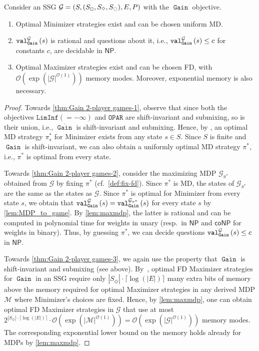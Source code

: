\documentclass[a4paper,UKenglish,cleveref,autoref,thm-restate]{lipics-v2021}
\DeclareMathOperator{\Gain}{\mathtt{Gain}}
\newcommand{\Oparity}{\mathtt{OPAR}}
\newcommand{\LimInf}[2]{\mathtt{LimInf}(#1 #2)}
\newcommand{\+}[1]{\mathbb{#1}}
\newcommand{\?}[1]{\mathcal{#1}}
\newcommand{\Ocompl}{\?{O}}
\newcommand{\rsymbol}{\ocircle}
\newcommand{\zsymbol}{\Box}
\newcommand{\osymbol}{\Diamond}
\newcommand{\zstates}{\states_\zsymbol}
\newcommand{\rstates}{\states_\rsymbol}
\newcommand{\ostates}{\states_\osymbol}
\newcommand{\NP}{\ensuremath{\mathsf{NP}}}
\newcommand{\coNP}{\ensuremath{\mathsf{coNP}}}
\newcommand{\lrc}[1]{\left(#1\right)}
\newcommand{\tuple}[1]{\lrc{#1}}
\newcommand{\game}{{\mathcal G}}
\newcommand{\mdp}{{\mathcal M}}
\newcommand{\gametuple}{\tuple{\states,(\zstates,\ostates,\rstates),\transition,\probp}}
\newcommand{\states}{S}
\newcommand{\s}{s}
\newcommand{\transition}{{E}}
\newcommand{\probp}{P}
\newcommand{\complementof}[1]{\overline{#1}}
\newcommand{\ostrat}{\pi}
\newcommand{\optostrat}{\ostrat^*}
\begin{document}
\begin{theorem}\label{thm:Gain 2-player games}
Consider an SSG $\game = \gametuple$ with the $\Gain$ objective.
\begin{enumerate}
\item\label{thm:Gain 2-player games-1}
  Optimal Minimizer strategies exist and can be chosen uniform MD.
\item\label{thm:Gain 2-player games-2}
  $\valueof[\game][\Gain]{\s}$ is rational and 
  questions about it, i.e., $\valueof[\game][\Gain]{\s} \le c$ for
  constants $c$, are decidable in $\NP$.
\item\label{thm:Gain 2-player games-3}
    Optimal Maximizer strategies exist and can be chosen FD,
    with $\Ocompl(\exp(|\game|^{\Ocompl(1)}))$ memory modes.
    Moreover, exponential memory is also necessary.  
\end{enumerate}
\end{theorem}
\begin{proof}
Towards \cref{thm:Gain 2-player games-1}, observe that since both the objectives $\LimInf{=}{-\infty}$ and
$\Oparity$ are shift-invariant and submixing, so is their union, i.e.,
$\complementof{\Gain}$ is shift-invariant and submixing.
Hence, by \cite[Theorem 1.1]{GK2022},
an optimal MD strategy $\optostrat_\s$ for Minimizer
exists from any state $\s \in \states$.
Since $\states$ is finite and $\Gain$ is shift-invariant,
we can also obtain a uniformly optimal MD strategy
$\optostrat$, i.e., $\optostrat$ is optimal from every state.

Towards \cref{thm:Gain 2-player games-2},
consider the maximizing MDP $\game_{\optostrat}$ obtained from $\game$ by 
fixing $\optostrat$ (cf.~\cref{def:fix-fd}).
Since $\optostrat$ is MD, the states of $\game_{\optostrat}$ are the
same as the states as $\game$.
Since $\optostrat$ is optimal for Minimizer from every state $\s$,
we obtain that $\valueof[\game][\Gain]{\s} =
\valueof[\game_{\optostrat}][\Gain]{\s}$ for every state $\s$ by
\cref{lem:MDP_to_game}.
By \cref{lem:maxmdp}, the latter is rational and can be computed in polynomial time for
weights in unary (resp.\ in $\NP$ and $\coNP$ for weights in binary).
Thus, by guessing $\optostrat$, we can decide questions
$\valueof[\game][\Gain]{\s} \le c$ in $\NP$.

Towards \cref{thm:Gain 2-player games-3}, we again use the property
that $\complementof{\Gain}$ is shift-invariant and submixing (see above).
By~\cite[Theorem 6, Def.~24]{MSTW2021}, optimal FD Maximizer strategies for $\Gain$ in an SSG require
only $|\ostates| \cdot \lceil\log(|E|)\rceil$ many extra bits of memory above the memory required for
optimal Maximizer strategies in any derived MDP $\mdp$ where Minimizer's choices
are fixed.
Hence, by \cref{lem:maxmdp}, one can obtain optimal FD Maximizer strategies in
$\game$ that use at most
$2^{|\ostates|\cdot\lceil\log(|E|)\rceil} \cdot \Ocompl(\exp(|\mdp|^{\Ocompl(1)})) = \Ocompl(\exp(|\game|^{\Ocompl(1)}))$
memory modes.
The corresponding exponential lower bound on the memory holds already for MDPs
by \cref{lem:maxmdp}.
\end{proof}
\end{document}
